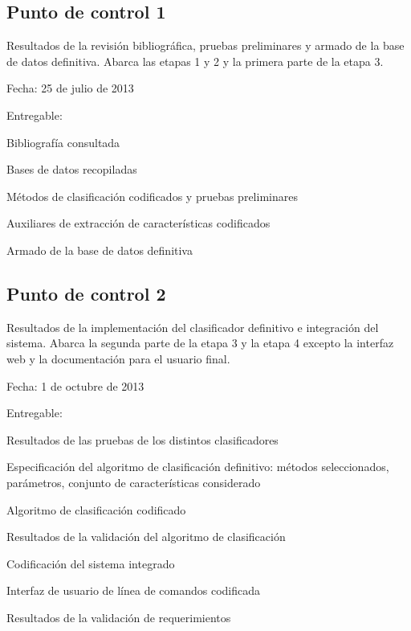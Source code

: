 \documentclass[12pt,bibliography=oldstyle,DIV=12,parskip=full-]{scrartcl}
\begin{document}
\subsection{Punto de control 1}
Resultados de la revisión bibliográfica, pruebas preliminares y armado
de la base de datos definitiva.  Abarca las etapas 1 y 2 y la primera
parte de la etapa 3.
\begin{description*}
  \item[Fecha:] 25 de julio de 2013
  \item[Entregable:]
  \item
    \begin{minipage}{\textwidth}
      \medskip
      \begin{itemize*}
      \item Bibliografía consultada
      \item Bases de datos recopiladas
      \item Métodos de clasificación codificados y pruebas preliminares
      \item Auxiliares de extracción de características codificados
      \item Armado de la base de datos definitiva
      \end{itemize*}
    \end{minipage}
\end{description*}
\newpage
\subsection{Punto de control 2}
Resultados de la implementación del clasificador definitivo e
integración del sistema. Abarca la segunda parte de la etapa 3 y la
etapa 4 excepto la interfaz web y la documentación para el usuario
final.
\begin{description*}
  \item[Fecha:] 1 de octubre de 2013
  \item[Entregable:]
  \item
    \begin{minipage}{\textwidth}
      \medskip
      \begin{itemize*}
      \item Resultados de las pruebas de los distintos clasificadores
      \item Especificación del algoritmo de clasificación definitivo:
        métodos seleccionados, parámetros, conjunto de características
        considerado
      \item Algoritmo de clasificación codificado
      \item Resultados de la validación del algoritmo de clasificación
      \item Codificación del sistema integrado
      \item Interfaz de usuario de línea de comandos codificada
      \item Resultados de la validación de requerimientos
      \end{itemize*}
    \end{minipage}
\end{description*}
\end{document}
